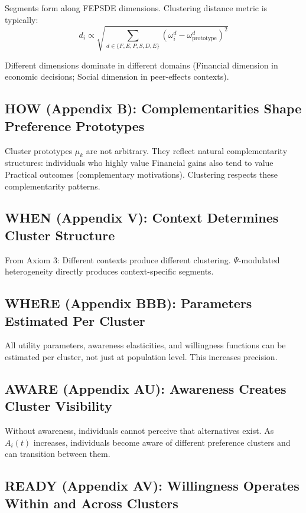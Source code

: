 Segments form along FEPSDE dimensions. Clustering distance metric is typically:
\begin{equation}
d_i \propto \sqrt{\sum_{d \in \{F,E,P,S,D,E\}} (\omega^d_i - \omega^d_{\text{prototype}})^2}
\end{equation}

Different dimensions dominate in different domains (Financial dimension in
economic decisions; Social dimension in peer-effects contexts).
\cite{fehr1999theory, fehr2002cooperation}

\subsection{HOW (Appendix B): Complementarities Shape Preference Prototypes}

Cluster prototypes $\mu_k$ are not arbitrary. They reflect natural complementarity
structures: individuals who highly value Financial gains also tend to value
Practical outcomes (complementary motivations). Clustering respects these
complementarity patterns.

\subsection{WHEN (Appendix V): Context Determines Cluster Structure}

From Axiom 3: Different contexts produce different clustering. $\Psi$-modulated
heterogeneity directly produces context-specific segments.

\subsection{WHERE (Appendix BBB): Parameters Estimated Per Cluster}

All utility parameters, awareness elasticities, and willingness functions can
be estimated per cluster, not just at population level. This increases precision.

\subsection{AWARE (Appendix AU): Awareness Creates Cluster Visibility}

Without awareness, individuals cannot perceive that alternatives exist. As
$A_i(t)$ increases, individuals become aware of different preference clusters
and can transition between them.

\subsection{READY (Appendix AV): Willingness Operates Within and Across Clusters}

